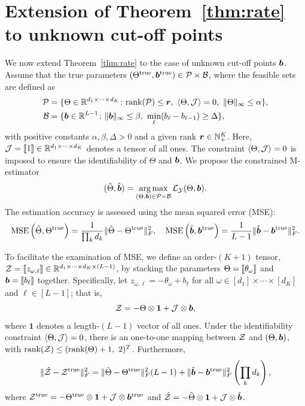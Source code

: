 \documentclass{article}
\theoremstyle{plain}
\theoremstyle{definition}
\begin{document}
\section{Extension of Theorem~\ref{thm:rate} to unknown cut-off points}\label{sec:extention}
We now extend Theorem~\ref{thm:rate} to the case of unknown cut-off points $\bm{b}$. Assume that the true parameters $(\Theta^{\mathrm{true}}, \bm{b}^{\mathrm{true}})\in \mathcal{P}\times \mathcal{B}$, where the feasible sets are defined as
\begin{align}
\tP&=\{\Theta\in\mathbb{R}^{d_1\times \cdots\times d_K}\colon \text{rank}(\tP)\leq \mr,\ \langle \Theta, \tJ \rangle=0,\ \mnormSize{}{\Theta}\leq \alpha\},\\
 \tB&=\{\mb\in\mathbb{R}^{L-1}\colon \mnormSize{}{\mb}\leq \beta,\ \min_{\ell}(b_\ell-b_{\ell-1}) \geq \Delta\},
\end{align}
with positive constants $\alpha,\beta,\Delta>0$ and a given rank $\bm{r}\in\mathbb{N}^K_{+}$. Here, $\mathcal{J}=\llbracket 1 \rrbracket\in\mathbb{R}^{d_1\times \cdots \times d_K}$ denotes a tensor of all ones. The constraint $\langle \Theta, \mathcal{J} \rangle=0$ is imposed to ensure the identifiability of $\Theta$ and $\bm{b}$. We propose the constrained M-estimator
\begin{equation}\label{eq:joint}
(\hat \Theta,\hat {\bm{b}})=\operatorname*{arg\,max}_{(\Theta,\bm{b})\in\mathcal{P}\times \mathcal{B}}\mathcal{L}_{\mathcal{Y}}(\Theta,\bm{b}).
\end{equation}
The estimation accuracy is assessed using the mean squared error (MSE):
\[
\text{MSE}\left( \hat \Theta, \Theta^{\mathrm{true}} \right)={1\over \prod_k d_k}\lVert\hat \Theta-\Theta^{\mathrm{true}}\rVert_F^2,\quad \text{MSE}\left( \hat {\bm{b}}, \bm{b}^{\mathrm{true}} \right)={1\over L-1}\lVert\hat {\bm{b}}-\bm{b}^{\mathrm{true}}\rVert_F^2.
\]

To facilitate the examination of MSE, we define an order-$(K+1)$ tensor, $\mathcal{Z}=\llbracket z_{\omega,\ell} \rrbracket\in\mathbb{R}^{d_1\times \cdots \times d_K\times (L-1)}$, by stacking the parameters $\Theta=\llbracket \theta_\omega \rrbracket$ and $\bm{b}=\llbracket b_\ell \rrbracket$ together. Specifically, let $z_{\omega,\ell}=-\theta_\omega+b_\ell$ for all $\omega\in[d_1]\times \cdots \times [d_K]$ and $\ell\in[L-1]$; that is,
\[
\mathcal{Z}=-\Theta\otimes \mathbf{1}+\mathcal{J}\otimes \bm{b},
\]
where $\mathbf{1}$ denotes a length-$(L-1)$ vector of all ones. Under the identifiability constraint $\langle \Theta, \mathcal{J} \rangle=0$, there is an one-to-one mapping between $\mathcal{Z}$ and $(\Theta, \bm{b})$, with $\text{rank}(\tZ)\leq (\text{rank}(\Theta)+1,\ 2)^T$. 
Furthermore, 
\begin{equation}\label{eq:decomp}
\lVert\hat {\mathcal{Z}}-\mathcal{Z}^{\mathrm{true}}\rVert_F^2=\lVert\hat \Theta-\Theta^{\mathrm{true}}\rVert_F^2 (L-1)+\lVert\hat {\bm{b}}-\bm{b}^{\mathrm{true}}\rVert_F^2 \left(\prod_kd_k\right),
\end{equation}
where $\mathcal{Z}^{\mathrm{true}}=-\Theta^{\mathrm{true}}\otimes \mathbf{1}+\mathcal{J}\otimes \bm{b}^{\mathrm{true}}$ and $\hat {\mathcal{Z}}=-\hat \Theta\otimes \mathbf{1}+\mathcal{J}\otimes \hat {\bm{b}}$. 
\end{document}
